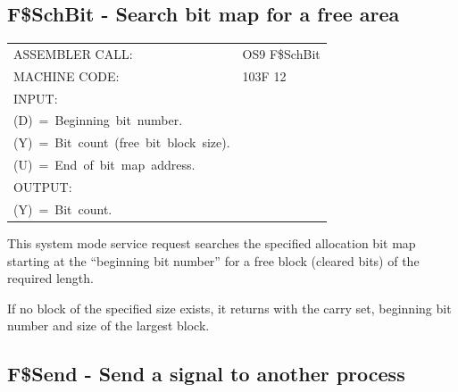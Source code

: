 \documentclass[
]{article}
\newcounter{none} %
\begin{document}
\subsection{F\$SchBit - Search bit map for a free area}

{\def\LTcaptype{none} %
\begin{longtable}[]{@{}
  >{\raggedright\arraybackslash}p{}
  >{\raggedright\arraybackslash}p{}@{}}
\toprule\noalign{}
\endhead
\bottomrule\noalign{}
\endlastfoot
ASSEMBLER CALL: & OS9 F\$SchBit \\
MACHINE CODE: & 103F 12 \\
INPUT: & \begin{minipage}[t]{\linewidth}\raggedright
(X)~=~Beginning~address~of~a~bit~map.\\
(D)~=~Beginning~bit~number.\\
(Y)~=~Bit~count~(free~bit~block~size).\\
(U)~=~End~of~bit~map~address.
\end{minipage} \\
OUTPUT: & \begin{minipage}[t]{\linewidth}\raggedright
(D)~=~Beginning~bit~number.\\
(Y)~=~Bit~count.
\end{minipage} \\
\end{longtable}
}

This system mode service request searches the specified allocation bit
map starting at the ``beginning bit number'' for a free block (cleared
bits) of the required length.

If no block of the specified size exists, it returns with the carry set,
beginning bit number and size of the largest block.

\subsection{F\$Send - Send a signal to another process}\label{f.send}
\end{document}
